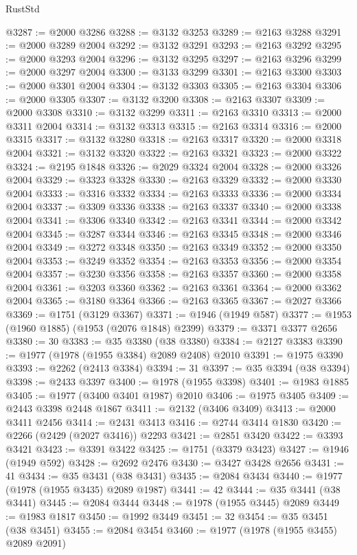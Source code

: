 \begin{lexlean}{RustStd}
\begin{coremodule}
@3287 := @2000 @3286
@3288 := @3132 @3253
@3289 := @2163 @3288
@3291 := @2000 @3289 @2004
@3292 := @3132 @3291
@3293 := @2163 @3292
@3295 := @2000 @3293 @2004
@3296 := @3132 @3295
@3297 := @2163 @3296
@3299 := @2000 @3297 @2004
@3300 := @3133 @3299
@3301 := @2163 @3300
@3303 := @2000 @3301 @2004
@3304 := @3132 @3303
@3305 := @2163 @3304
@3306 := @2000 @3305
@3307 := @3132 @3200
@3308 := @2163 @3307
@3309 := @2000 @3308
@3310 := @3132 @3299
@3311 := @2163 @3310
@3313 := @2000 @3311 @2004
@3314 := @3132 @3313
@3315 := @2163 @3314
@3316 := @2000 @3315
@3317 := @3132 @3280
@3318 := @2163 @3317
@3320 := @2000 @3318 @2004
@3321 := @3132 @3320
@3322 := @2163 @3321
@3323 := @2000 @3322
@3324 := @2195 @1848
@3326 := @2029 @3324 @2004
@3328 := @2000 @3326 @2004
@3329 := @3323 @3328
@3330 := @2163 @3329
@3332 := @2000 @3330 @2004
@3333 := @3316 @3332
@3334 := @2163 @3333
@3336 := @2000 @3334 @2004
@3337 := @3309 @3336
@3338 := @2163 @3337
@3340 := @2000 @3338 @2004
@3341 := @3306 @3340
@3342 := @2163 @3341
@3344 := @2000 @3342 @2004
@3345 := @3287 @3344
@3346 := @2163 @3345
@3348 := @2000 @3346 @2004
@3349 := @3272 @3348
@3350 := @2163 @3349
@3352 := @2000 @3350 @2004
@3353 := @3249 @3352
@3354 := @2163 @3353
@3356 := @2000 @3354 @2004
@3357 := @3230 @3356
@3358 := @2163 @3357
@3360 := @2000 @3358 @2004
@3361 := @3203 @3360
@3362 := @2163 @3361
@3364 := @2000 @3362 @2004
@3365 := @3180 @3364
@3366 := @2163 @3365
@3367 := @2027 @3366
@3369 := @1751 (@3129 @3367)
@3371 := @1946 (@1949 @587)
@3377 := @1953 (@1960 @1885) (@1953 (@2076 @1848) @2399)
@3379 := @3371 @3377 @2656
@3380 := 30
@3383 := @35 @3380 (@38 @3380)
@3384 := @2127 @3383
@3390 := @1977 (@1978 (@1955 @3384) @2089 @2408) @2010
@3391 := @1975 @3390
@3393 := @2262 (@2413 @3384)
@3394 := 31
@3397 := @35 @3394 (@38 @3394)
@3398 := @2433 @3397
@3400 := @1978 (@1955 @3398)
@3401 := @1983 @1885
@3405 := @1977 (@3400 @3401 @1987) @2010
@3406 := @1975 @3405
@3409 := @2443 @3398 @2448 @1867
@3411 := @2132 (@3406 @3409)
@3413 := @2000 @3411 @2456
@3414 := @2431 @3413
@3416 := @2744 @3414 @1830
@3420 := @2266 (@2429 (@2027 @3416)) @2293
@3421 := @2851 @3420
@3422 := @3393 @3421
@3423 := @3391 @3422
@3425 := @1751 (@3379 @3423)
@3427 := @1946 (@1949 @592)
@3428 := @2692 @2476
@3430 := @3427 @3428 @2656
@3431 := 41
@3434 := @35 @3431 (@38 @3431)
@3435 := @2084 @3434
@3440 := @1977 (@1978 (@1955 @3435) @2089 @1987)
@3441 := 42
@3444 := @35 @3441 (@38 @3441)
@3445 := @2084 @3444
@3448 := @1978 (@1955 @3445) @2089
@3449 := @1983 @1817
@3450 := @1992 @3449
@3451 := 32
@3454 := @35 @3451 (@38 @3451)
@3455 := @2084 @3454
@3460 := @1977 (@1978 (@1955 @3455) @2089 @2091)

\end{coremodule}
\end{lexlean}
